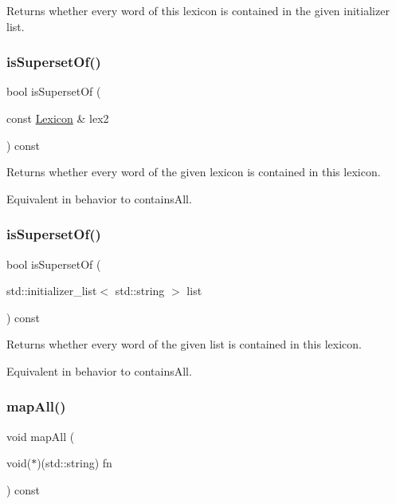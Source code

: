 Returns whether every word of this lexicon is contained in the given initializer list. 

\mbox{\label{classLexicon_ad6a4796a72905df1e33f4b100cb91f32}} 
\subsubsection{\texorpdfstring{is\+Superset\+Of()}{isSupersetOf()}\hspace{0.1cm}{\footnotesize\ttfamily [1/2]}}
{\footnotesize\ttfamily bool is\+Superset\+Of (\begin{DoxyParamCaption}\item[{const \mbox{\hyperlink{classLexicon}{Lexicon}} \&}]{lex2 }\end{DoxyParamCaption}) const}



Returns whether every word of the given lexicon is contained in this lexicon. 

Equivalent in behavior to contains\+All. \mbox{\label{classLexicon_a217cbc1e6ba9f694645608c8a17c1943}} 
\subsubsection{\texorpdfstring{is\+Superset\+Of()}{isSupersetOf()}\hspace{0.1cm}{\footnotesize\ttfamily [2/2]}}
{\footnotesize\ttfamily bool is\+Superset\+Of (\begin{DoxyParamCaption}\item[{std\+::initializer\+\_\+list$<$ std\+::string $>$}]{list }\end{DoxyParamCaption}) const}



Returns whether every word of the given list is contained in this lexicon. 

Equivalent in behavior to contains\+All. \mbox{\label{classLexicon_a2e4e14ffb291ba4d5475b9b66d2a12c8}} 
\subsubsection{\texorpdfstring{map\+All()}{mapAll()}\hspace{0.1cm}{\footnotesize\ttfamily [1/3]}}
{\footnotesize\ttfamily void map\+All (\begin{DoxyParamCaption}\item[{void($\ast$)(std\+::string)}]{fn }\end{DoxyParamCaption}) const}



